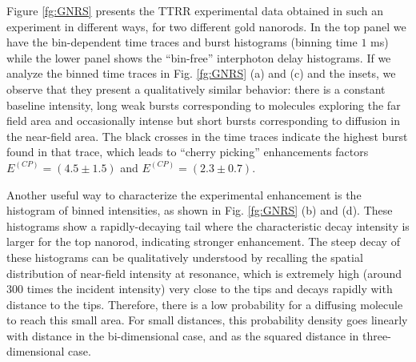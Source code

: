 Figure \ref{fg:GNRS} presents the TTRR experimental data obtained in 
such an experiment in different ways, for two different gold nanorods. 
In the top panel we have the bin-dependent time traces and burst histograms (binning time $1$ ms) while the lower panel
shows the ``bin-free'' interphoton delay histograms.
If we analyze the binned time traces in Fig. \ref{fg:GNRS} (a) and (c) and the insets, we observe that they
present a qualitatively similar behavior: there is a constant baseline
intensity, long weak bursts corresponding to molecules exploring the far field area and occasionally 
intense but short bursts corresponding to diffusion in the near-field area\cite{pradhan2016goldnanorodenhanced}. 
The black crosses in the time traces indicate the highest burst found in that trace, which leads to 
``cherry picking'' enhancements factors $E^{(CP)}=(4.5 \pm 1.5)$ and $E^{(CP)}=(2.3\pm 0.7)$.



Another useful way to characterize the experimental enhancement is the histogram 
of binned intensities, as shown in Fig. \ref{fg:GNRS} 
(b) and (d). These histograms show a rapidly-decaying tail where the characteristic 
decay intensity is larger for the top nanorod, indicating stronger enhancement. The 
steep decay of these histograms can be qualitatively understood by recalling the spatial 
distribution of near-field intensity at resonance, which is
extremely high (around $300$ times the incident intensity) very close to the tips and 
decays rapidly with distance to the tips. 
Therefore, there is a low probability for a diffusing molecule to reach this small area. 
For small distances, this probability density goes linearly with distance 
in the bi-dimensional case, and as the squared distance in three-dimensional case. 

